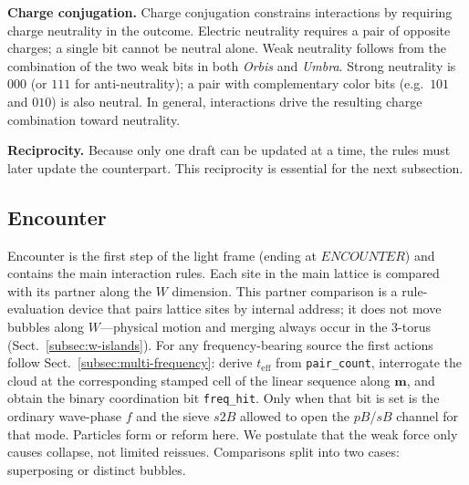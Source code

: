 \documentclass{ijuc}
\begin{document}
\medskip\noindent\textbf{Charge conjugation.} Charge conjugation constrains interactions by requiring charge neutrality in the outcome. Electric neutrality requires a pair of opposite charges; a single bit cannot be neutral alone. Weak neutrality follows from the combination of the two weak bits in both \textit{Orbis} and \textit{Umbra}. Strong neutrality is $000$ (or $111$ for anti-neutrality); a pair with complementary color bits (e.g.\ $101$ and $010$) is also neutral. In general, interactions drive the resulting charge combination toward neutrality.

\medskip\noindent\textbf{Reciprocity.} Because only one draft can be updated at a time, the rules must later update the counterpart. This reciprocity is essential for the next subsection.
\subsection{Encounter} \label{subsec:encounter}
Encounter is the first step of the light frame (ending at $ENCOUNTER$) and contains the main interaction rules. Each site in the main lattice is compared with its partner along the $W$ dimension. This partner comparison is a rule-evaluation device that pairs lattice sites by internal address; it does not move bubbles along $W$---physical motion and merging always occur in the 3-torus (Sect.~\ref{subsec:w-islands}). For any frequency-bearing source the first actions follow Sect.~\ref{subsec:multi-frequency}: derive $t_{\mathrm{eff}}$ from \texttt{pair\_count}, interrogate the cloud at the corresponding stamped cell of the linear sequence along $\boldsymbol{m}$, and obtain the binary coordination bit \texttt{freq\_hit}. Only when that bit is set is the ordinary wave-phase $f$ and the sieve $s2B$ allowed to open the $pB$/$sB$ channel for that mode. Particles form or reform here. We postulate that the weak force only causes collapse, not limited reissues. Comparisons split into two cases: superposing or distinct bubbles.
\end{document}
